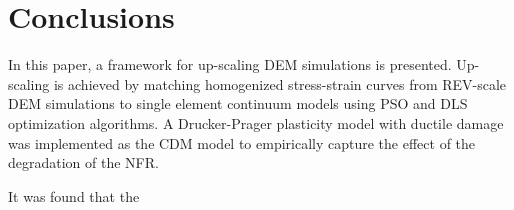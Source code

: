 \section{Conclusions}
In this paper, a framework for up-scaling DEM simulations is presented. Up-scaling is achieved by matching homogenized stress-strain curves from REV-scale DEM simulations to single element continuum models using PSO and DLS optimization algorithms. A Drucker-Prager plasticity model with ductile damage was implemented as the CDM model to empirically capture the effect of the degradation of the NFR.

It was found that the 











\clearpage